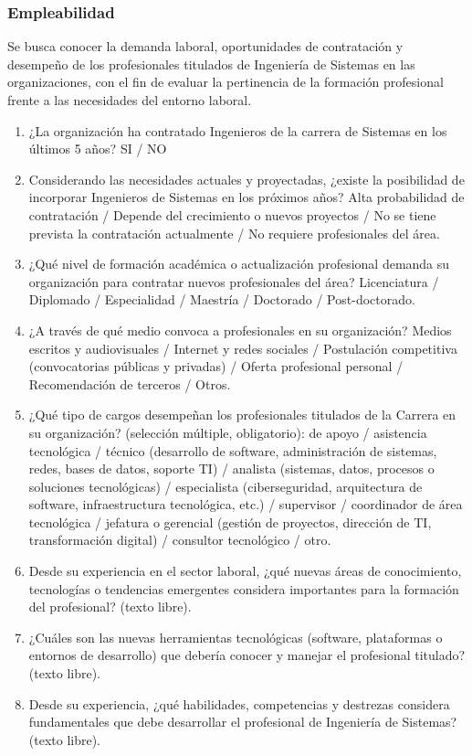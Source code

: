\documentclass[12pt]{article}
\begin{document}
\subsubsection*{Empleabilidad}

Se busca conocer la demanda laboral, oportunidades de contratación y
desempeño de los profesionales titulados de Ingeniería de Sistemas en las
organizaciones, con el fin de evaluar la pertinencia de la formación
profesional frente a las necesidades del entorno laboral.

\begin{enumerate}[resume]
    \item ¿La organización ha contratado Ingenieros de la carrera de
    Sistemas en los últimos 5 años? SI / NO
    \item Considerando las necesidades actuales y proyectadas, ¿existe la
    posibilidad de incorporar Ingenieros de Sistemas en los próximos
    años? Alta probabilidad de contratación / Depende del crecimiento o
    nuevos proyectos / No se tiene prevista la contratación actualmente /
    No requiere profesionales del área.
    \item ¿Qué nivel de formación académica o actualización profesional
    demanda su organización para contratar nuevos profesionales del
    área? Licenciatura / Diplomado / Especialidad / Maestría / Doctorado
    / Post-doctorado.
    \item ¿A través de qué medio convoca a profesionales en su
    organización? Medios escritos y audiovisuales / Internet y redes
    sociales / Postulación competitiva (convocatorias públicas y
    privadas) / Oferta profesional personal / Recomendación de terceros /
    Otros.
    \item ¿Qué tipo de cargos desempeñan los profesionales titulados de
    la Carrera en su organización? (selección múltiple, obligatorio): de
    apoyo / asistencia tecnológica / técnico (desarrollo de software,
    administración de sistemas, redes, bases de datos, soporte TI) /
    analista (sistemas, datos, procesos o soluciones tecnológicas) /
    especialista (ciberseguridad, arquitectura de software,
    infraestructura tecnológica, etc.) / supervisor / coordinador de área
    tecnológica / jefatura o gerencial (gestión de proyectos, dirección
    de TI, transformación digital) / consultor tecnológico / otro.
    \item Desde su experiencia en el sector laboral, ¿qué nuevas áreas de
    conocimiento, tecnologías o tendencias emergentes considera
    importantes para la formación del profesional? (texto libre).
    \item ¿Cuáles son las nuevas herramientas tecnológicas (software,
    plataformas o entornos de desarrollo) que debería conocer y manejar
    el profesional titulado? (texto libre).
    \item Desde su experiencia, ¿qué habilidades, competencias y
    destrezas considera fundamentales que debe desarrollar el profesional
    de Ingeniería de Sistemas? (texto libre).
\end{enumerate}
\end{document}
